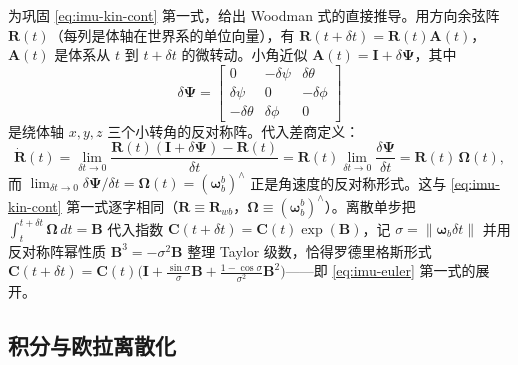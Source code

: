 \begin{derivation}[姿态微分方程的捷联推导]
为巩固 \cref{eq:imu-kin-cont} 第一式，给出 Woodman 式的直接推导\cite{woodman2007inertial}。用方向余弦阵 $\mathbf R(t)$（每列是体轴在世界系的单位向量），有 $\mathbf R(t+\delta t)=\mathbf R(t)\mathbf A(t)$，$\mathbf A(t)$ 是体系从 $t$ 到 $t+\delta t$ 的微转动。小角近似 $\mathbf A(t)=\mathbf I+\delta\boldsymbol\Psi$，其中
\[
  \delta\boldsymbol\Psi=\begin{bmatrix}0&-\delta\psi&\delta\theta\\\delta\psi&0&-\delta\phi\\-\delta\theta&\delta\phi&0\end{bmatrix}
\]
是绕体轴 $x,y,z$ 三个小转角的反对称阵。代入差商定义：
\[
  \dot{\mathbf R}(t)=\lim_{\delta t\to0}\frac{\mathbf R(t)(\mathbf I+\delta\boldsymbol\Psi)-\mathbf R(t)}{\delta t}
  =\mathbf R(t)\lim_{\delta t\to0}\frac{\delta\boldsymbol\Psi}{\delta t}=\mathbf R(t)\,\boldsymbol\Omega(t),
\]
而 $\lim_{\delta t\to0}\delta\boldsymbol\Psi/\delta t=\boldsymbol\Omega(t)=(\boldsymbol\omega_b^b)^\wedge$ 正是角速度的反对称形式。这与 \cref{eq:imu-kin-cont} 第一式逐字相同（$\mathbf R\equiv\mathbf R_{wb}$，$\boldsymbol\Omega\equiv(\boldsymbol\omega_b^b)^\wedge$）。离散单步把 $\int_t^{t+\delta t}\boldsymbol\Omega\,dt=\mathbf B$ 代入指数 $\mathbf C(t{+}\delta t)=\mathbf C(t)\exp(\mathbf B)$，记 $\sigma=\|\boldsymbol\omega_b\delta t\|$ 并用反对称阵幂性质 $\mathbf B^3=-\sigma^2\mathbf B$ 整理 Taylor 级数，恰得罗德里格斯形式 $\mathbf C(t{+}\delta t)=\mathbf C(t)\big(\mathbf I+\tfrac{\sin\sigma}{\sigma}\mathbf B+\tfrac{1-\cos\sigma}{\sigma^2}\mathbf B^2\big)$——即 \cref{eq:imu-euler} 第一式的展开。
\end{derivation}

\subsection{积分与欧拉离散化}
\label{subsec:imu-euler}


